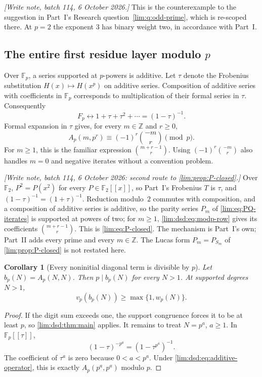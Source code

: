 \documentclass[11pt]{article}
\newtheorem{corollary}[theorem]{Corollary}
\theoremstyle{definition}
\theoremstyle{remark}
\newcommand{\Ftwo}{\mathbb F_2}
\newcommand{\Z}{\mathbb Z}
\newcommand{\Fp}{\mathbb F_p}
\begin{document}
\emph{[Write note, batch 114, 6 October 2026.]} This is the counterexample to the suggestion in
Part~I's Research question~\ref{lim:q:odd-prime}, which is re-scoped there.
At $p=2$ the exponent $3$ has binary weight two, in accordance with Part~I.

\subsection{The entire first residue layer modulo \texorpdfstring{$p$}{p}}

Over $\Fp$, a series supported at $p$-powers is additive. Let
$\tau$ denote the Frobenius substitution $H(x)\mapsto H(x^p)$ on
additive series. Composition of additive series with coefficients
in $\Fp$ corresponds to multiplication of their formal series in
$\tau$. Consequently
\begin{equation}
 F_p\longleftrightarrow1+\tau+\tau^2+\cdots=(1-\tau)^{-1}.
 \label{lim:dsd:eq:additive-operator}
\end{equation}
Formal expansion in $\tau$ gives, for every $m\in\Z$ and $r\ge0$,
\begin{equation}
 A_p(m,p^r)\equiv(-1)^r\binom{-m}{r}\pmod p.
 \label{lim:dsd:eq:modp-row}
\end{equation}
For $m\ge1$, this is the familiar expression
$\binom{m+r-1}{r}$. Using $(-1)^r\binom{-m}{r}$ also handles
$m=0$ and negative iterates without a convention problem.

\emph{[Write note, batch 114, 6 October 2026: second route to \cref{lim:prop:P-closed}.]} Over
$\Ftwo$, $P^2=P(x^2)$ for every $P\in\Ftwo[[x]]$, so Part~I's Frobenius $T$
is $\tau$, and $(1-\tau)^{-1}=(1+\tau)^{-1}$. Reduction modulo~$2$ commutes
with composition, and a composition of additive series is additive, so the
parity series $P_m$ of \eqref{lim:eq:PQ-iterates} is supported at powers of
two; for $m\ge1$, \eqref{lim:dsd:eq:modp-row} gives its coefficients
$\binom{m+r-1}{r}$. This is \eqref{lim:eq:P-closed}. The mechanism is
Part~I's own; Part~II adds every prime and every $m\in\mathbb Z$. The Lucas
form $P_m=P_{S_m}$ of \cref{lim:prop:P-closed} is not restated here.

\begin{corollary}[Every noninitial diagonal term is divisible by $p$]
\label{lim:dsd:cor:diagonal-p}
Let $b_p(N)=A_p(N,N)$. Then $p\mid b_p(N)$ for every $N>1$.
At supported degrees $N>1$,
\begin{equation}
 v_p(b_p(N))\ge\max\{1,w_p(N)\}.
 \label{lim:dsd:eq:diagonal-strengthened}
\end{equation}
\end{corollary}
\begin{proof}
If the digit sum exceeds one, the support congruence forces it to be
at least $p$, so \cref{lim:dsd:thm:main} applies. It remains to treat $N=p^a$,
$a\ge1$. In $\Fp[[\tau]]$,
\[
 (1-\tau)^{-p^a}=(1-\tau^{p^a})^{-1}.
\]
The coefficient of $\tau^a$ is zero because $0<a<p^a$. Under
\eqref{lim:dsd:eq:additive-operator}, this is exactly $A_p(p^a,p^a)$ modulo $p$.
\end{proof}
\end{document}
